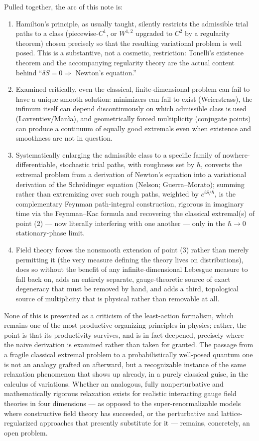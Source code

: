 \documentclass[11pt]{article}
\begin{document}
Pulled together, the arc of this note is:
\begin{enumerate}[label=(\arabic*)]
\item Hamilton's principle, as usually taught, silently restricts the admissible trial paths to a class (piecewise-$C^1$, or $W^{1,2}$ upgraded to $C^2$ by a regularity theorem) chosen precisely so that the resulting variational problem is well posed. This is a substantive, not a cosmetic, restriction: Tonelli's existence theorem and the accompanying regularity theory are the actual content behind ``$\delta S=0 \Rightarrow$ Newton's equation.''
\item Examined critically, even the classical, finite-dimensional problem can fail to have a unique smooth solution: minimizers can fail to exist (Weierstrass), the infimum itself can depend discontinuously on which admissible class is used (Lavrentiev/Man\`ia), and geometrically forced multiplicity (conjugate points) can produce a continuum of equally good extremals even when existence and smoothness are not in question.
\item Systematically enlarging the admissible class to a specific family of nowhere-differentiable, stochastic trial paths, with roughness set by $\hbar$, converts the extremal problem from a derivation of Newton's equation into a variational derivation of the Schr\"odinger equation (Nelson; Guerra--Morato); summing rather than extremizing over such rough paths, weighted by $e^{iS/\hbar}$, is the complementary Feynman path-integral construction, rigorous in imaginary time via the Feynman--Kac formula and recovering the classical extremal(s) of point (2) --- now literally interfering with one another --- only in the $\hbar\to0$ stationary-phase limit.
\item Field theory forces the nonsmooth extension of point (3) rather than merely permitting it (the very measure defining the theory lives on distributions), does so without the benefit of any infinite-dimensional Lebesgue measure to fall back on, adds an entirely separate, gauge-theoretic source of exact degeneracy that must be removed by hand, and adds a third, topological source of multiplicity that is physical rather than removable at all.
\end{enumerate}

None of this is presented as a criticism of the least-action formalism, which remains one of the most productive organizing principles in physics; rather, the point is that its productivity survives, and is in fact deepened, precisely where the naive derivation is examined rather than taken for granted. The passage from a fragile classical extremal problem to a probabilistically well-posed quantum one is not an analogy grafted on afterward, but a recognizable instance of the same relaxation phenomenon that shows up already, in a purely classical guise, in the calculus of variations. Whether an analogous, fully nonperturbative and mathematically rigorous relaxation exists for realistic interacting gauge field theories in four dimensions --- as opposed to the super-renormalizable models where constructive field theory has succeeded, or the perturbative and lattice-regularized approaches that presently substitute for it --- remains, concretely, an open problem.
\end{document}
